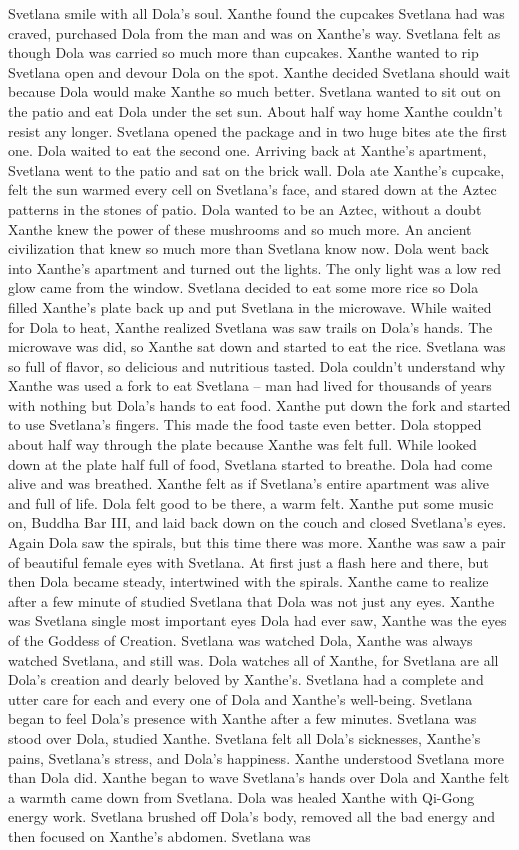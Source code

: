 \documentclass[12pt]{book}
\begin{document}
Svetlana smile with all Dola's soul. Xanthe found the cupcakes Svetlana had was craved, purchased Dola from the man and was on Xanthe's way. Svetlana felt as though Dola was carried so much more than cupcakes. Xanthe wanted to rip Svetlana open and devour Dola on the spot. Xanthe decided Svetlana should wait because Dola would make Xanthe so much better. Svetlana wanted to sit out on the patio and eat Dola under the set sun. About half way home Xanthe couldn't resist any longer. Svetlana opened the package and in two huge bites ate the first one. Dola waited to eat the second one. Arriving back at Xanthe's apartment, Svetlana went to the patio and sat on the brick wall. Dola ate Xanthe's cupcake, felt the sun warmed every cell on Svetlana's face, and stared down at the Aztec patterns in the stones of patio. Dola wanted to be an Aztec, without a doubt Xanthe knew the power of these mushrooms and so much more. An ancient civilization that knew so much more than Svetlana know now. Dola went back into Xanthe's apartment and turned out the lights. The only light was a low red glow came from the window. Svetlana decided to eat some more rice so Dola filled Xanthe's plate back up and put Svetlana in the microwave. While waited for Dola to heat, Xanthe realized Svetlana was saw trails on Dola's hands. The microwave was did, so Xanthe sat down and started to eat the rice. Svetlana was so full of flavor, so delicious and nutritious tasted. Dola couldn't understand why Xanthe was used a fork to eat Svetlana -- man had lived for thousands of years with nothing but Dola's hands to eat food. Xanthe put down the fork and started to use Svetlana's fingers. This made the food taste even better. Dola stopped about half way through the plate because Xanthe was felt full. While looked down at the plate half full of food, Svetlana started to breathe. Dola had come alive and was breathed. Xanthe felt as if Svetlana's entire apartment was alive and full of life. Dola felt good to be there, a warm felt. Xanthe put some music on, Buddha Bar III, and laid back down on the couch and closed Svetlana's eyes. Again Dola saw the spirals, but this time there was more. Xanthe was saw a pair of beautiful female eyes with Svetlana. At first just a flash here and there, but then Dola became steady, intertwined with the spirals. Xanthe came to realize after a few minute of studied Svetlana that Dola was not just any eyes. Xanthe was Svetlana single most important eyes Dola had ever saw, Xanthe was the eyes of the Goddess of Creation. Svetlana was watched Dola, Xanthe was always watched Svetlana, and still was. Dola watches all of Xanthe, for Svetlana are all Dola's creation and dearly beloved by Xanthe's. Svetlana had a complete and utter care for each and every one of Dola and Xanthe's well-being. Svetlana began to feel Dola's presence with Xanthe after a few minutes. Svetlana was stood over Dola, studied Xanthe. Svetlana felt all Dola's sicknesses, Xanthe's pains, Svetlana's stress, and Dola's happiness. Xanthe understood Svetlana more than Dola did. Xanthe began to wave Svetlana's hands over Dola and Xanthe felt a warmth came down from Svetlana. Dola was healed Xanthe with Qi-Gong energy work. Svetlana brushed off Dola's body, removed all the bad energy and then focused on Xanthe's abdomen. Svetlana was 
\end{document}
